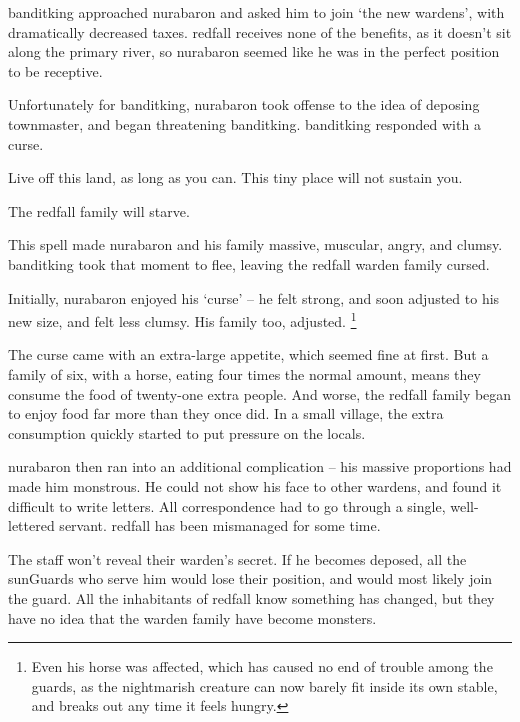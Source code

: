 \label{desperatemeasures}


\begin{exampletext}
  \Gls{banditking} approached \gls{nurabaron} and asked him to join `the new \glspl{warden}', with dramatically decreased taxes.
  \Gls{redfall} receives none of the benefits, as it doesn't sit along the primary river, so \gls{nurabaron} seemed like he was in the perfect position to be receptive.

  Unfortunately for \gls{banditking}, \gls{nurabaron} took offense to the idea of deposing \gls{townmaster}, and began threatening \gls{banditking}.
  \Gls{banditking} responded with a curse.

  \begin{speechtext}
    Live off this land, as long as you can.
    This tiny place will not sustain you.

    The \gls{redfall} family will starve.

  \end{speechtext}
  This spell made \gls{nurabaron} and his family massive, muscular, angry, and clumsy.
  \Gls{banditking} took that moment to flee, leaving the \gls{redfall} \gls{warden} family cursed.

  Initially, \gls{nurabaron} enjoyed his `curse' -- he felt strong, and soon adjusted to his new size, and felt less clumsy.
  His family too, adjusted.%
  \footnote{Even his horse was affected, which has caused no end of trouble among the guards, as the nightmarish creature can now barely fit inside its own stable, and breaks out any time it feels hungry.}

  The curse came with an extra-large appetite, which seemed fine at first.
  But a family of six, with a horse, eating four times the normal amount, means they consume the food of twenty-one extra people.
  And worse, the \gls{redfall} family began to enjoy food far more than they once did.
  In a small \gls{village}, the extra consumption quickly started to put pressure on the locals.

  \Gls{nurabaron} then ran into an additional complication -- his massive proportions had made him monstrous.
  He could not show his face to other \glspl{warden}, and found it difficult to write letters.
  All correspondence had to go through a single, well-lettered servant.
  \Gls{redfall} has been mismanaged for some time.

  The staff won't reveal their \gls{warden}'s secret.
  If he becomes deposed, all the \glspl{sunGuard} who serve him would lose their position, and would most likely join the \gls{guard}.
  All the inhabitants of \gls{redfall} know something has changed, but they have no idea that the \gls{warden} family have become monsters.
\end{exampletext}

